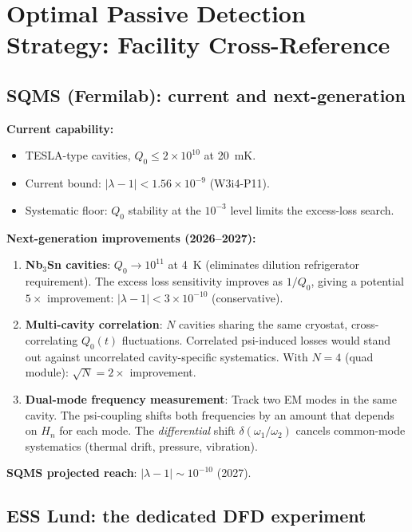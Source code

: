 \documentclass[11pt]{article}
\newcommand{\lam}{\lambda}
\newcommand{\ee}[1]{\times 10^{#1}}
\newcommand{\Heff}{H_n}
\newcommand{\lbone}{|\lam - 1|}
\theoremstyle{definition}
\theoremstyle{remark}
\begin{document}
\section{Optimal Passive Detection Strategy: Facility Cross-Reference}
\label{sec:facility_cross}

\subsection{SQMS (Fermilab): current and next-generation}
\label{ssec:SQMS}

\textbf{Current capability:}
\begin{itemize}[nosep]
\item TESLA-type cavities, $Q_0 \leq 2\ee{10}$ at 20~mK.
\item Current bound: $\lbone < 1.56\ee{-9}$ (W3i4-P11).
\item Systematic floor: $Q_0$ stability at the $10^{-3}$ level limits
  the excess-loss search.
\end{itemize}

\textbf{Next-generation improvements (2026--2027):}
\begin{enumerate}[nosep]
\item \textbf{Nb$_3$Sn cavities}: $Q_0 \to 10^{11}$ at 4~K (eliminates
  dilution refrigerator requirement). The excess loss sensitivity improves
  as $1/Q_0$, giving a potential $5\times$ improvement:
  $\lbone < 3\ee{-10}$ (conservative).
\item \textbf{Multi-cavity correlation}: $N$ cavities sharing the same
  cryostat, cross-correlating $Q_0(t)$ fluctuations. Correlated psi-induced
  losses would stand out against uncorrelated cavity-specific systematics.
  With $N = 4$ (quad module): $\sqrt{N} = 2\times$ improvement.
\item \textbf{Dual-mode frequency measurement}: Track two EM modes in the
  same cavity. The psi-coupling shifts both frequencies by an amount that
  depends on $\Heff$ for each mode. The \emph{differential} shift
  $\delta(\omega_1/\omega_2)$ cancels common-mode systematics (thermal
  drift, pressure, vibration).
\end{enumerate}

\textbf{SQMS projected reach}: $\lbone \sim 10^{-10}$ (2027).

\subsection{ESS Lund: the dedicated DFD experiment}
\label{ssec:ESS}
\end{document}
